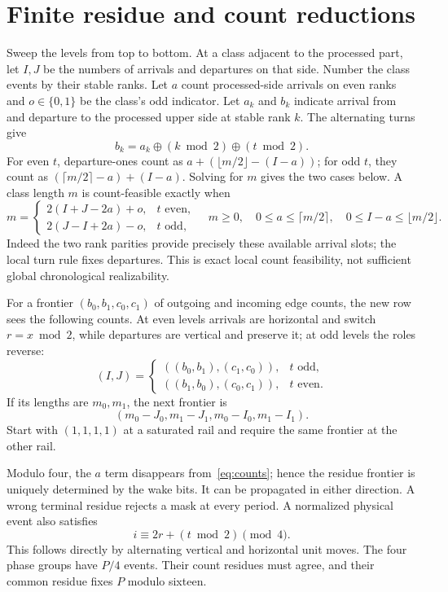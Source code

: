 \documentclass[11pt]{article}
\theoremstyle{definition}\newtheorem{definition}[theorem]{Definition}
\newcommand{\xor}{\mathbin{\oplus}}
\begin{document}
\section{Finite residue and count reductions}
Sweep the levels from top to bottom. At a class adjacent to the processed part, let $I,J$ be the numbers of arrivals
and departures on that side. Number the class events by their stable ranks.
Let $a$ count processed-side arrivals on even ranks and $o\in\{0,1\}$ be the
class's odd indicator. Let $a_k$ and $b_k$ indicate arrival from and
departure to the processed upper side at stable rank $k$. The alternating
turns give
\[
 b_k=a_k\xor(k\bmod2)\xor(t\bmod2).
\]
For even $t$, departure-ones count as $a+(\lfloor m/2\rfloor-(I-a))$;
for odd $t$, they count as $(\lceil m/2\rceil-a)+(I-a)$.
Solving for $m$ gives the two cases below. A class length $m$ is count-feasible
exactly when
\begin{equation}\label{eq:counts}
 m=\begin{cases}2(I+J-2a)+o,&t\text{ even},\\
 2(J-I+2a)-o,&t\text{ odd},\end{cases}
 \quad m\ge0,\quad 0\le a\le\lceil m/2\rceil,
 \quad0\le I-a\le\lfloor m/2\rfloor.
\end{equation}
Indeed the two rank parities provide precisely these available arrival slots;
the local turn rule fixes departures. This is exact local count feasibility,
not sufficient global chronological realizability.

For a frontier $(b_0,b_1,c_0,c_1)$ of outgoing and incoming edge counts, the new
row sees the following counts. At even levels arrivals are horizontal
and switch $r=x\bmod2$, while departures are vertical and preserve it;
at odd levels the roles reverse:
\[
(I,J)=\begin{cases}((b_0,b_1),(c_1,c_0)),&t\text{ odd},\\
((b_1,b_0),(c_0,c_1)),&t\text{ even}.
\end{cases}
\]
If its lengths are $m_0,m_1$, the next frontier is
\begin{equation}\label{eq:frontier}
(m_0-J_0,m_1-J_1,m_0-I_0,m_1-I_1).
\end{equation}
Start with $(1,1,1,1)$ at a saturated rail and require the same frontier at
the other rail.

Modulo four, the $a$ term disappears from~\eqref{eq:counts}; hence the residue
frontier is uniquely determined by the wake bits. It can be propagated in
either direction. A wrong terminal residue rejects a mask at every period.
A normalized physical event also satisfies
\begin{equation}\label{eq:phase}
i\equiv2r+(t\bmod2)\pmod4.
\end{equation}
This follows directly by alternating vertical and horizontal unit moves.
The four phase groups have $P/4$ events. Their count residues must agree,
and their common residue fixes $P$ modulo sixteen.
\end{document}
